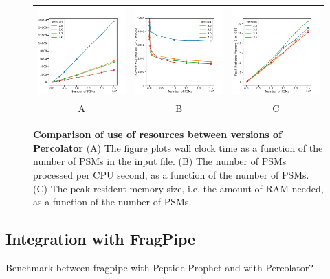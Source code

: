 \documentclass{article}
\begin{document}
\begin{figure}
  \begin{center}
    \begin{tabular}{ccc}
    \includegraphics[width=0.3\linewidth]{img/wall.png} &
    \includegraphics[width=0.3\linewidth]{img/rate.png} &
    \includegraphics[width=0.3\linewidth]{img/memory.png} \\
    A & B & C \\
    \end{tabular}
    \caption{\textbf{Comparison of use of resources between versions of Percolator} 
      (A) The figure plots wall clock time as a function of the number of PSMs in the input file.
      (B) The number of PSMs processed per CPU second, as a function of the number of PSMs.
    (C) The peak resident memory size, i.e. the amount of RAM needed, as a function of the number of PSMs.}
    \label{fig:x}
  \end{center}
\end{figure}

\subsection{Integration with FragPipe}

Benchmark between fragpipe with Peptide Prophet and with Percolator?
\end{document}
